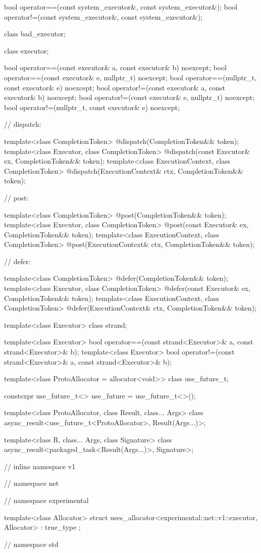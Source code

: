 \begin{codeblock}
{{{{  bool operator==(const system_executor&, const system_executor&);
  bool operator!=(const system_executor&, const system_executor&);

  class bad_executor;

  class executor;

  bool operator==(const executor& a, const executor& b) noexcept;
  bool operator==(const executor& e, nullptr_t) noexcept;
  bool operator==(nullptr_t, const executor& e) noexcept;
  bool operator!=(const executor& a, const executor& b) noexcept;
  bool operator!=(const executor& e, nullptr_t) noexcept;
  bool operator!=(nullptr_t, const executor& e) noexcept;

  // dispatch:

  template<class CompletionToken>
    @\DEDUCED@ dispatch(CompletionToken&& token);
  template<class Executor, class CompletionToken>
    @\DEDUCED@ dispatch(const Executor& ex, CompletionToken&& token);
  template<class ExecutionContext, class CompletionToken>
    @\DEDUCED@ dispatch(ExecutionContext& ctx, CompletionToken&& token);

  // post:

  template<class CompletionToken>
    @\DEDUCED@ post(CompletionToken&& token);
  template<class Executor, class CompletionToken>
    @\DEDUCED@ post(const Executor& ex, CompletionToken&& token);
  template<class ExecutionContext, class CompletionToken>
    @\DEDUCED@ post(ExecutionContext& ctx, CompletionToken&& token);

  // defer:

  template<class CompletionToken>
    @\DEDUCED@ defer(CompletionToken&& token);
  template<class Executor, class CompletionToken>
    @\DEDUCED@ defer(const Executor& ex, CompletionToken&& token);
  template<class ExecutionContext, class CompletionToken>
    @\DEDUCED@ defer(ExecutionContext& ctx, CompletionToken&& token);

  template<class Executor>
    class strand;

  template<class Executor>
    bool operator==(const strand<Executor>& a, const strand<Executor>& b);
  template<class Executor>
    bool operator!=(const strand<Executor>& a, const strand<Executor>& b);

  template<class ProtoAllocator = allocator<void>>
    class use_future_t;

  constexpr use_future_t<> use_future = use_future_t<>();

  template<class ProtoAllocator, class Result, class... Args>
    class async_result<use_future_t<ProtoAllocator>, Result(Args...)>;

  template<class R, class... Args, class Signature>
    class async_result<packaged_task<Result(Args...)>, Signature>;

} // inline namespace v1
} // namespace net
} // namespace experimental

  template<class Allocator>
    struct uses_allocator<experimental::net::v1::executor, Allocator>
      : true_type {};

} // namespace std
\end{codeblock}



